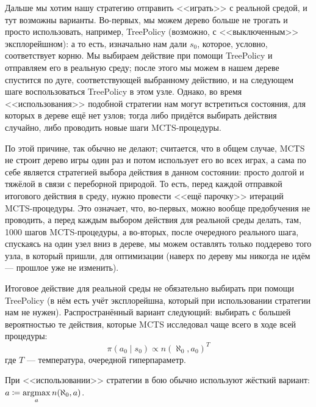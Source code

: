 Дальше мы хотим нашу стратегию отправить <<играть>> с реальной средой, и тут возможны варианты. Во-первых, мы можем дерево больше не трогать и просто использовать, например, TreePolicy (возможно, с <<выключенным>> эксплорейшном): а то есть, изначально нам дали $s_0$, которое, условно, соответствует корню. Мы выбираем действие при помощи TreePolicy и отправляем его в реальную среду; после этого мы можем в нашем дереве спустится по дуге, соответствующей выбранному действию, и на следующем шаге воспользоваться TreePolicy в этом узле. Однако, во время <<использования>> подобной стратегии нам могут встретиться состояния, для которых в дереве ещё нет узлов; тогда либо придётся выбирать действия случайно, либо проводить новые шаги MCTS-процедуры.

По этой причине, так обычно не делают; считается, что в общем случае, MCTS не строит дерево игры один раз и потом использует его во всех играх, а сама по себе является стратегией выбора действия в данном состоянии: просто долгой и тяжёлой в связи с переборной природой. То есть, перед каждой отправкой итогового действия в среду, нужно провести <<ещё парочку>> итераций MCTS-процедуры. Это означает, что, во-первых, можно вообще предобучения не проводить, а перед каждым выбором действия для реальной среды делать, там, 1000 шагов MCTS-процедуры, а во-вторых, после очередного реального шага, спускаясь на один узел вниз в дереве, мы можем оставлять только поддерево того узла, в который пришли, для оптимизации (наверх по дереву мы никогда не идём --- прошлое уже не изменить).

Итоговое действие для реальной среды не обязательно выбирать при помощи TreePolicy (в нём есть учёт эксплорейшна, который при использовании стратегии нам не нужен). Распространённый вариант следующий: выбирать с большей вероятностью те действия, которые MCTS исследовал чаще всего в ходе всей процедуры:
$$\pi(a_0 \mid s_0) \propto n(\aleph_0, a_0)^T$$
где $T$ --- температура, очередной гиперпараметр.

\begin{remark}
При <<использовании>> стратегии в бою обычно используют жёсткий вариант: $a \coloneqq \mathop{\mathrm{argmax}}\limits_a n(\aleph_0, a)$.
\end{remark}

